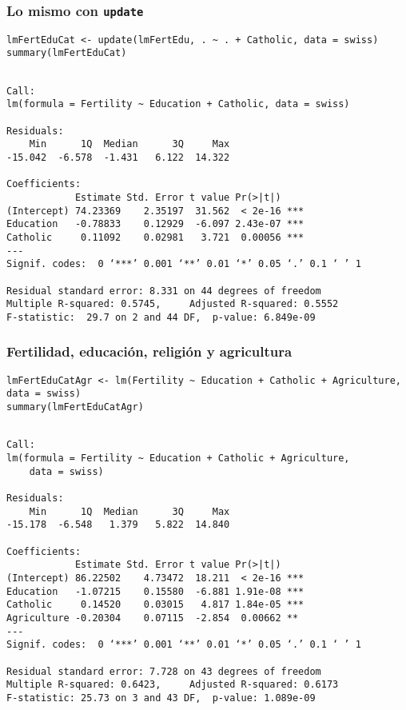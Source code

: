 \documentclass[bigger]{beamer}
\begin{document}
\begin{frame}[fragile]
\frametitle{Lo mismo con \texttt{update}}
\label{sec-3-4}


\lstset{language=R}
\begin{lstlisting}
lmFertEduCat <- update(lmFertEdu, . ~ . + Catholic, data = swiss)
summary(lmFertEduCat)
\end{lstlisting}


\begin{verbatim}

Call:
lm(formula = Fertility ~ Education + Catholic, data = swiss)

Residuals:
    Min      1Q  Median      3Q     Max 
-15.042  -6.578  -1.431   6.122  14.322 

Coefficients:
            Estimate Std. Error t value Pr(>|t|)    
(Intercept) 74.23369    2.35197  31.562  < 2e-16 ***
Education   -0.78833    0.12929  -6.097 2.43e-07 ***
Catholic     0.11092    0.02981   3.721  0.00056 ***
---
Signif. codes:  0 ‘***’ 0.001 ‘**’ 0.01 ‘*’ 0.05 ‘.’ 0.1 ‘ ’ 1 

Residual standard error: 8.331 on 44 degrees of freedom
Multiple R-squared: 0.5745,     Adjusted R-squared: 0.5552 
F-statistic:  29.7 on 2 and 44 DF,  p-value: 6.849e-09
\end{verbatim}
\end{frame}
\begin{frame}[fragile]
\frametitle{Fertilidad, educación, religión y agricultura}
\label{sec-3-5}


\lstset{language=R}
\begin{lstlisting}
lmFertEduCatAgr <- lm(Fertility ~ Education + Catholic + Agriculture, data = swiss)
summary(lmFertEduCatAgr)
\end{lstlisting}


\begin{verbatim}

Call:
lm(formula = Fertility ~ Education + Catholic + Agriculture, 
    data = swiss)

Residuals:
    Min      1Q  Median      3Q     Max 
-15.178  -6.548   1.379   5.822  14.840 

Coefficients:
            Estimate Std. Error t value Pr(>|t|)    
(Intercept) 86.22502    4.73472  18.211  < 2e-16 ***
Education   -1.07215    0.15580  -6.881 1.91e-08 ***
Catholic     0.14520    0.03015   4.817 1.84e-05 ***
Agriculture -0.20304    0.07115  -2.854  0.00662 ** 
---
Signif. codes:  0 ‘***’ 0.001 ‘**’ 0.01 ‘*’ 0.05 ‘.’ 0.1 ‘ ’ 1 

Residual standard error: 7.728 on 43 degrees of freedom
Multiple R-squared: 0.6423,     Adjusted R-squared: 0.6173 
F-statistic: 25.73 on 3 and 43 DF,  p-value: 1.089e-09
\end{verbatim}
\end{frame}
\end{document}
